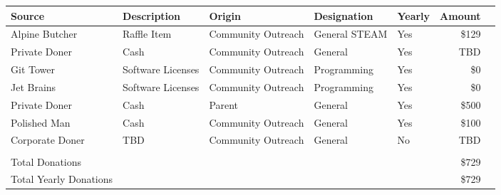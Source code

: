 \documentclass{article}
\begin{document}
\begin{table}[bh]
\begin{tabular}{ lllllrr }
Source & Description & Origin & Designation & Yearly & Amount \\
\hline               
Alpine Butcher& Raffle Item & Community Outreach  &  General STEAM  & Yes & \$129 \\
Private Doner &  Cash  &  Community Outreach  &  General &  Yes & TBD \\
Git Tower  & Software Licenses &  Community Outreach  &  Programming & Yes & \$0 \\
Jet Brains & Software Licenses  & Community Outreach  &  Programming & Yes & \$0 \\
Private Doner  & Cash   & Parent  & General  & Yes & \$500 \\
Polished Man &  Cash  &  Community Outreach &  General &  Yes & \$100 \\
Corporate Doner &  TBD   &  Community Outreach   &     General & No &TBD \\     
\hline                    
      &&& \\                      
Total Donations & & & &      &           \$729 \\
Total Yearly Donations    &&&&&              \$729 \\

\hline
\end{tabular}
\end{table}

\newpage
\section*{}



%
%
\end{document}
